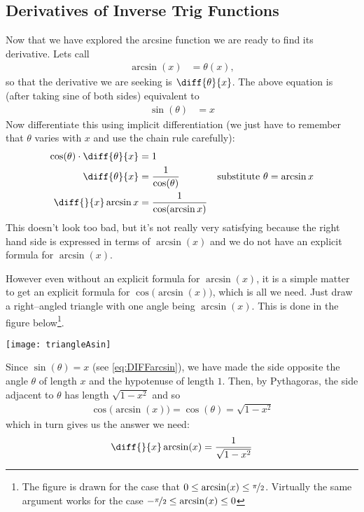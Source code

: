 \subsection*{Derivatives of Inverse Trig Functions}
Now that we have explored the arcsine function we are ready to find its derivative.
Lets call
\begin{align*}
  \arcsin(x) &= \theta(x),
\end{align*}
so that the derivative we are seeking is $\diff{\theta}{x}$. The above equation is (after
taking sine of both sides) equivalent to
\begin{align*}
  \sin(\theta) &= x
\end{align*}
Now differentiate this using implicit differentiation (we just have to remember
that $\theta$ varies with $x$ and use the chain rule carefully):
\begin{align*}
  \cos(\theta) \cdot \diff{\theta}{x} &= 1 \\
  \diff{\theta}{x} &= \frac{1}{\cos(\theta)} & \text{substitute $\theta = \arcsin x$}\\
  \diff{}{x} \arcsin x &= \frac{1}{\cos(\arcsin x)}
\end{align*}
This doesn't look too bad, but it's not really very satisfying because the right hand
side is expressed in terms of $\arcsin(x)$ and we do not have an explicit formula for
$\arcsin(x)$.

However even without an explicit formula for $\arcsin(x)$, it is a simple matter to get an
explicit formula for $\cos\big(\arcsin(x)\big)$, which is all we need. Just draw a
right--angled triangle with one angle being $\arcsin(x)$. This is done in the figure
below\footnote{The figure is drawn for the case that
$0\le\arcsin(x)\le\nicefrac{\pi}{2}$.
Virtually the same argument works for the case
$-\nicefrac{\pi}{2}\le\arcsin(x)\le 0$}.
\begin{efig}
\begin{center}
  \texttt{[image: triangleAsin]}
\end{center}
\end{efig}
Since $\sin(\theta)=x$ (see \eqref{eq:DIFFarcsin}),
we have made the side opposite the angle $\theta$ of length $x$ and the
hypotenuse of length $1$. Then, by Pythagoras, the side adjacent to $\theta$
has length $\sqrt{1-x^2}$ and so
\begin{align*}
\cos\big(\arcsin(x)\big)=\cos(\theta)=\sqrt{1-x^2}
\end{align*}
which in turn gives us the answer we need:
\begin{align*}%
\diff{}{x} \arcsin(x) =\frac{1}{\sqrt{1-x^2}}
\end{align*}

